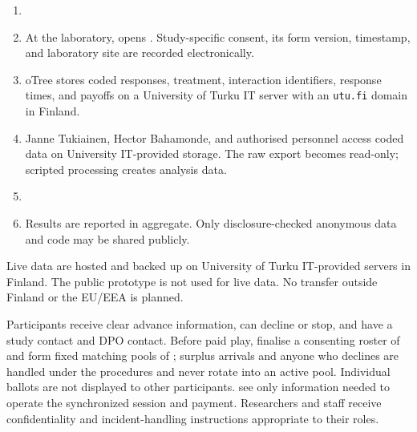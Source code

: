 \begin{enumerate}
  \item {}
  \item At the laboratory,  opens . Study-specific consent, its form version, timestamp, and laboratory site are recorded electronically. 
  \item oTree stores coded responses, treatment, interaction identifiers, response times, and payoffs on a University of Turku IT server with an \texttt{utu.fi} domain in Finland.
  \item Janne Tukiainen, Hector Bahamonde, and authorised personnel access coded data on University IT-provided storage. The raw export becomes read-only; scripted processing creates analysis data.
  \item {}
  \item Results are reported in aggregate.  Only disclosure-checked anonymous data and code may be shared publicly.
\end{enumerate}

Live data are hosted and backed up on University of Turku IT-provided servers in Finland. The public prototype is not used for live data. No transfer outside Finland or the EU/EEA is planned.

Participants receive clear advance information, can decline or stop, and have a study contact and DPO contact. Before paid play,  finalise a consenting roster of  and form fixed matching pools of ; surplus arrivals and anyone who declines are handled under the  procedures and never rotate into an active pool. Individual ballots are not displayed to other participants.  see only information needed to operate the synchronized session and payment. Researchers and staff receive confidentiality and incident-handling instructions appropriate to their roles.

